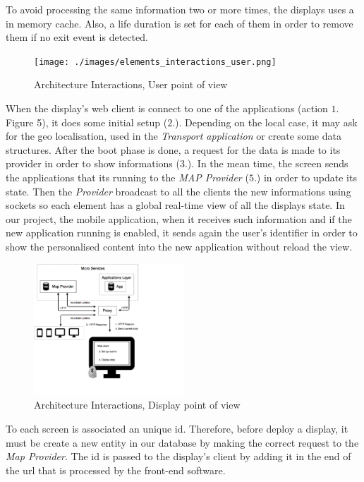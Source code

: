 \documentclass[]{usiinfbachelorproject}
\begin{document}
To avoid processing the same information two or more times, the displays uses a in memory cache. Also, a life duration is set for each of them in order to remove them if no exit event is detected.
\begin{figure}[H]
  \centering
  \texttt{[image: ./images/elements\_interactions\_user.png]}
  \caption{Architecture Interactions, User point of view}

\end{figure} 
When the display's web client is connect to one of the applications (action $1.$ Figure 5), it does some initial setup ($2.$). Depending on the local case, it may ask for the geo localisation, used in the \emph{Transport application} or create some data structures. After the boot phase is done, a request for the data is made to its provider in order to show informations ($3.$).
In the mean time, the screen sends the applications that its running to the \emph{MAP Provider} ($5.$) in order to update its state. Then the \emph{Provider} broadcast to all the clients the new informations using sockets so each element has a global real-time view of all the displays state. In our project, the mobile application, when it receives such information and if the new application running is enabled, it sends again the user's identifier in order to show the personalised content into the new application without reload the view.
\begin{figure}[H]
  \centering
  \includegraphics[width=0.5\textwidth]{./images/elements_interactions_display.png}
  \caption{Architecture Interactions, Display point of view}

\end{figure} 
To each screen is associated an unique id. Therefore, before deploy a display, it must be create a new entity in our database by making the correct request to the \emph{Map Provider}. The id is passed to the display's client by adding it in the end of the url that is processed by the front-end software.
\end{document}
